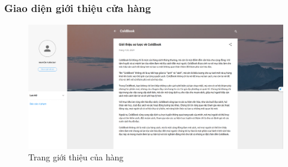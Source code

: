 \subsubsection{Giao diện giới thiệu cửa hàng}
\begin{figure}[H]
  \centering
  \includegraphics[width=1\textwidth]{report/images/client/c_lienhe.png}
  \caption{Trang giới thiệu của hàng}
\end{figure}